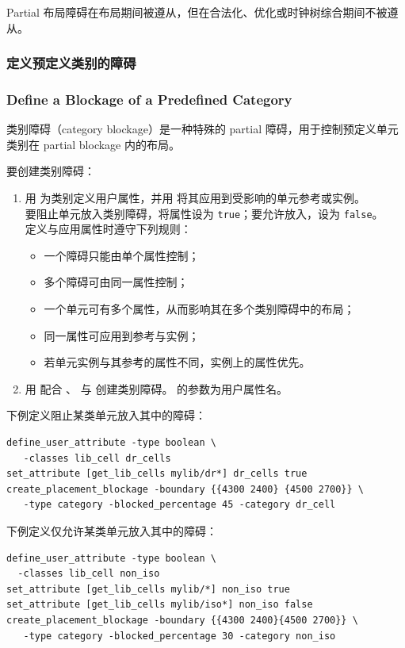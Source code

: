\begin{noteBox}
Partial 布局障碍在布局期间被遵从，但在合法化、优化或时钟树综合期间不被遵从。
\end{noteBox}

\subsubsection{定义预定义类别的障碍}
\subsubsection*{Define a Blockage of a Predefined Category}

类别障碍（category blockage）是一种特殊的 partial 障碍，用于控制预定义单元类别在 partial blockage 内的布局。

要创建类别障碍：
\begin{enumerate}
  \item 用  为类别定义用户属性，并用  将其应用到受影响的单元参考或实例。\\
    要阻止单元放入类别障碍，将属性设为 \texttt{true}；要允许放入，设为 \texttt{false}。\\
    定义与应用属性时遵守下列规则：
    \begin{itemize}
      \item 一个障碍只能由单个属性控制；
      \item 多个障碍可由同一属性控制；
      \item 一个单元可有多个属性，从而影响其在多个类别障碍中的布局；
      \item 同一属性可应用到参考与实例；
      \item 若单元实例与其参考的属性不同，实例上的属性优先。
    \end{itemize}
  \item 用  配合 、 与  创建类别障碍。 的参数为用户属性名。
\end{enumerate}

下例定义阻止某类单元放入其中的障碍：
\begin{lstlisting}
define_user_attribute -type boolean \
   -classes lib_cell dr_cells
set_attribute [get_lib_cells mylib/dr*] dr_cells true
create_placement_blockage -boundary {{4300 2400} {4500 2700}} \
   -type category -blocked_percentage 45 -category dr_cell
\end{lstlisting}

下例定义仅允许某类单元放入其中的障碍：
\begin{lstlisting}
define_user_attribute -type boolean \
  -classes lib_cell non_iso
set_attribute [get_lib_cells mylib/*] non_iso true
set_attribute [get_lib_cells mylib/iso*] non_iso false
create_placement_blockage -boundary {{4300 2400}{4500 2700}} \
   -type category -blocked_percentage 30 -category non_iso
\end{lstlisting}

